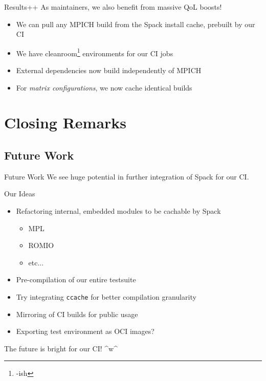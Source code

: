 \documentclass{beamer}
\begin{document}
\begin{frame}{Results++}
	As maintainers, we also benefit from massive QoL boosts!
	\pause
	\begin{itemize}
		\item We can pull any MPICH build from the Spack install cache, prebuilt
			by our CI
			\pause
		\item We have cleanroom\footnote{-ish} environments for our CI jobs
			\pause
		\item External dependencies now build independently of MPICH
			\pause
		\item For \textit{matrix configurations}, we now cache identical builds
	\end{itemize}
\end{frame}

\section{Closing Remarks}
\subsection{Future Work}
\begin{frame}{Future Work}
	We see huge potential in further integration of Spack for our CI.
	\pause

	\begin{block}{Our Ideas}
		\begin{itemize}
			\item Refactoring internal, embedded modules to be cachable by Spack
				\pause
				\begin{itemize}
					\item MPL
					\item ROMIO
					\item etc...
				\end{itemize}
				\pause
			\item Pre-compilation of our entire testsuite
				\pause
			\item Try integrating \texttt{ccache} for better compilation
				granularity
				\pause
			\item Mirroring of CI builds for public usage
				\pause
			\item Exporting test environment as OCI images?
				\pause
		\end{itemize}
	\end{block}

	The future is bright for our CI! \^{}w\^{}
\end{frame}
\end{document}
